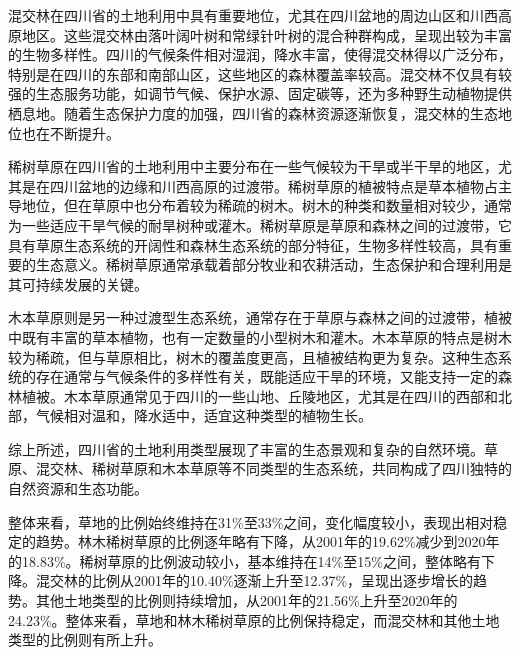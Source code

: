 \documentclass{article}
\begin{document}
		混交林在四川省的土地利用中具有重要地位，尤其在四川盆地的周边山区和川西高原地区。这些混交林由落叶阔叶树和常绿针叶树的混合种群构成，呈现出较为丰富的生物多样性。四川的气候条件相对湿润，降水丰富，使得混交林得以广泛分布，特别是在四川的东部和南部山区，这些地区的森林覆盖率较高。混交林不仅具有较强的生态服务功能，如调节气候、保护水源、固定碳等，还为多种野生动植物提供栖息地。随着生态保护力度的加强，四川省的森林资源逐渐恢复，混交林的生态地位也在不断提升。
		
		稀树草原在四川省的土地利用中主要分布在一些气候较为干旱或半干旱的地区，尤其是在四川盆地的边缘和川西高原的过渡带。稀树草原的植被特点是草本植物占主导地位，但在草原中也分布着较为稀疏的树木。树木的种类和数量相对较少，通常为一些适应干旱气候的耐旱树种或灌木。稀树草原是草原和森林之间的过渡带，它具有草原生态系统的开阔性和森林生态系统的部分特征，生物多样性较高，具有重要的生态意义。稀树草原通常承载着部分牧业和农耕活动，生态保护和合理利用是其可持续发展的关键。
		
		木本草原则是另一种过渡型生态系统，通常存在于草原与森林之间的过渡带，植被中既有丰富的草本植物，也有一定数量的小型树木和灌木。木本草原的特点是树木较为稀疏，但与草原相比，树木的覆盖度更高，且植被结构更为复杂。这种生态系统的存在通常与气候条件的多样性有关，既能适应干旱的环境，又能支持一定的森林植被。木本草原通常见于四川的一些山地、丘陵地区，尤其是在四川的西部和北部，气候相对温和，降水适中，适宜这种类型的植物生长。
		
		综上所述，四川省的土地利用类型展现了丰富的生态景观和复杂的自然环境。草原、混交林、稀树草原和木本草原等不同类型的生态系统，共同构成了四川独特的自然资源和生态功能。
		
		
		整体来看，草地的比例始终维持在31\%至33\%之间，变化幅度较小，表现出相对稳定的趋势。林木稀树草原的比例逐年略有下降，从2001年的19.62\%减少到2020年的18.83\%。稀树草原的比例波动较小，基本维持在14\%至15\%之间，整体略有下降。混交林的比例从2001年的10.40\%逐渐上升至12.37\%，呈现出逐步增长的趋势。其他土地类型的比例则持续增加，从2001年的21.56\%上升至2020年的24.23\%。整体来看，草地和林木稀树草原的比例保持稳定，而混交林和其他土地类型的比例则有所上升。
		
\end{document}

